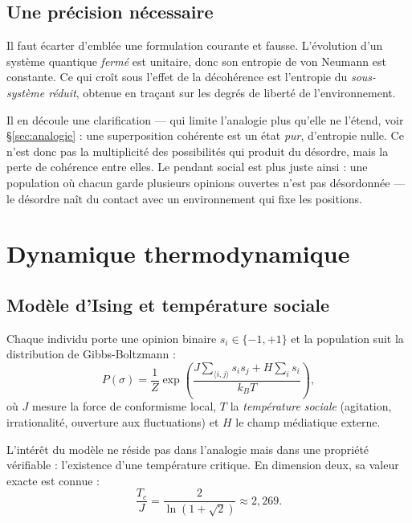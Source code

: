 \documentclass[11pt,a4paper]{article}
\begin{document}
\subsection{Une précision nécessaire}

Il faut écarter d'emblée une formulation courante et fausse. L'évolution d'un système
quantique \emph{fermé} est unitaire, donc son entropie de von Neumann est constante. Ce
qui croît sous l'effet de la décohérence est l'entropie du \emph{sous-système réduit},
obtenue en traçant sur les degrés de liberté de l'environnement.

Il en découle une clarification --- qui limite l'analogie plus qu'elle ne l'étend, voir
\S\ref{sec:analogie} : une superposition cohérente est un état \emph{pur}, d'entropie nulle. Ce n'est donc pas la
multiplicité des possibilités qui produit du désordre, mais la perte de cohérence entre
elles. Le pendant social est plus juste ainsi : une population où chacun garde plusieurs
opinions ouvertes n'est pas désordonnée --- le désordre naît du contact avec un
environnement qui fixe les positions.

\section{Dynamique thermodynamique}

\subsection{Modèle d'Ising et température sociale}

Chaque individu porte une opinion binaire $s_i \in \{-1,+1\}$ et la population suit la
distribution de Gibbs-Boltzmann \citep{ising1925} :
\begin{equation}
P(\sigma) = \frac{1}{Z}
\exp\!\left(\frac{J \sum_{\langle i,j\rangle} s_i s_j + H \sum_i s_i}{k_B T}\right),
\end{equation}
où $J$ mesure la force de conformisme local, $T$ la \emph{température sociale} (agitation,
irrationalité, ouverture aux fluctuations) et $H$ le champ médiatique externe.

L'intérêt du modèle ne réside pas dans l'analogie mais dans une propriété vérifiable :
l'existence d'une température critique. En dimension deux, sa valeur exacte est connue
\citep{onsager1944} :
\begin{equation}
\frac{T_c}{J} = \frac{2}{\ln(1+\sqrt{2})} \approx 2{,}269 .
\label{eq:onsager}
\end{equation}
\end{document}
